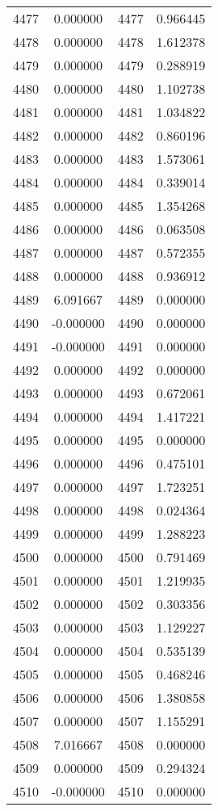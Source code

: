 \documentclass[12pt]{article}
\begin{document}
\begin{longtable}{@{}cccc@{}}
4477 & 0.000000 & 4477 & 0.966445 \\
4478 & 0.000000 & 4478 & 1.612378 \\
4479 & 0.000000 & 4479 & 0.288919 \\
4480 & 0.000000 & 4480 & 1.102738 \\
4481 & 0.000000 & 4481 & 1.034822 \\
4482 & 0.000000 & 4482 & 0.860196 \\
4483 & 0.000000 & 4483 & 1.573061 \\
4484 & 0.000000 & 4484 & 0.339014 \\
4485 & 0.000000 & 4485 & 1.354268 \\
4486 & 0.000000 & 4486 & 0.063508 \\
4487 & 0.000000 & 4487 & 0.572355 \\
4488 & 0.000000 & 4488 & 0.936912 \\
4489 & 6.091667 & 4489 & 0.000000 \\
4490 & -0.000000 & 4490 & 0.000000 \\
4491 & -0.000000 & 4491 & 0.000000 \\
4492 & 0.000000 & 4492 & 0.000000 \\
4493 & 0.000000 & 4493 & 0.672061 \\
4494 & 0.000000 & 4494 & 1.417221 \\
4495 & 0.000000 & 4495 & 0.000000 \\
4496 & 0.000000 & 4496 & 0.475101 \\
4497 & 0.000000 & 4497 & 1.723251 \\
4498 & 0.000000 & 4498 & 0.024364 \\
4499 & 0.000000 & 4499 & 1.288223 \\
4500 & 0.000000 & 4500 & 0.791469 \\
4501 & 0.000000 & 4501 & 1.219935 \\
4502 & 0.000000 & 4502 & 0.303356 \\
4503 & 0.000000 & 4503 & 1.129227 \\
4504 & 0.000000 & 4504 & 0.535139 \\
4505 & 0.000000 & 4505 & 0.468246 \\
4506 & 0.000000 & 4506 & 1.380858 \\
4507 & 0.000000 & 4507 & 1.155291 \\
4508 & 7.016667 & 4508 & 0.000000 \\
4509 & 0.000000 & 4509 & 0.294324 \\
4510 & -0.000000 & 4510 & 0.000000 \\

\end{longtable}
\end{document}
